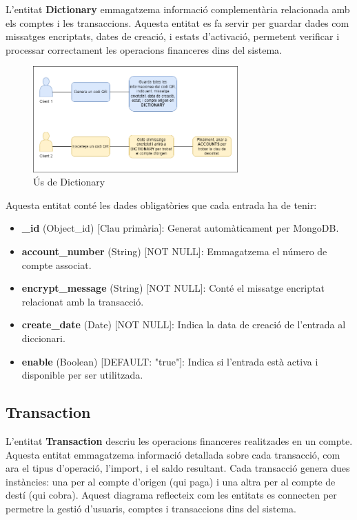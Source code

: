 \documentclass[a4paper,12pt,twoside]{ThesisStyle}
\begin{document}
L'entitat \textbf{Dictionary} emmagatzema informació complementària relacionada amb els comptes i les transaccions. Aquesta entitat es fa servir per guardar dades com missatges encriptats, dates de creació, i estats d'activació, permetent verificar i processar correctament les operacions financeres dins del sistema.\\


\begin{figure}[h]
    \centering
    \includegraphics[width=0.7\textwidth]{imatges/dictionary.png}
    \caption{ Ús de Dictionary }
    \label{fig: Ús de Dictionary}
\end{figure}


Aquesta entitat conté les dades obligatòries que cada entrada ha de tenir:

\begin{itemize}
    \item \textbf{\_id} (Object\_id) [Clau primària]: Generat automàticament per MongoDB.
    \item \textbf{account\_number} (String) [NOT NULL]: Emmagatzema el número de compte associat.
    \item \textbf{encrypt\_message} (String) [NOT NULL]: Conté el missatge encriptat relacionat amb la transacció.
    \item \textbf{create\_date} (Date) [NOT NULL]: Indica la data de creació de l'entrada al diccionari.
    \item \textbf{enable} (Boolean) [DEFAULT: "true"]: Indica si l'entrada està activa i disponible per ser utilitzada.
\end{itemize}



\subsection{Transaction}
\label{subsec: Transaction}


L'entitat \textbf{Transaction} descriu les operacions financeres realitzades en un compte. Aquesta entitat emmagatzema informació detallada sobre cada transacció, com ara el tipus d'operació, l'import, i el saldo resultant. Cada transacció genera dues instàncies: una per al compte d'origen (qui paga) i una altra per al compte de destí (qui cobra). Aquest diagrama reflecteix com les entitats es connecten per permetre la gestió d'usuaris, comptes i transaccions dins del sistema.\\
\end{document}
